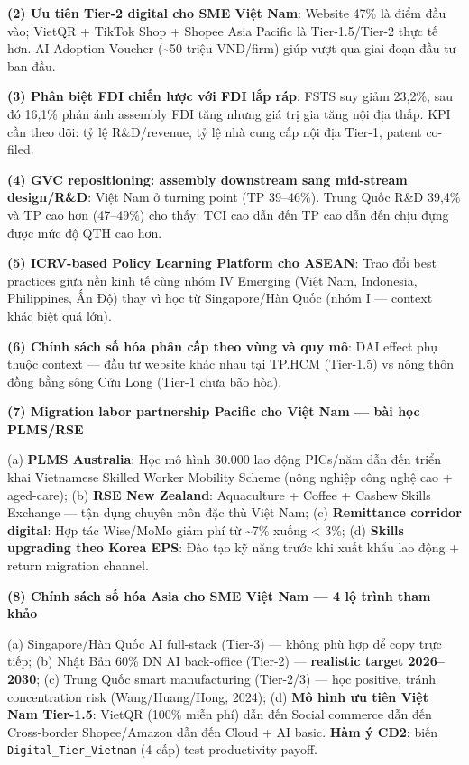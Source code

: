 \documentclass[12pt,a4paper]{article}
\begin{document}
\textbf{(2) Ưu tiên Tier-2 digital cho SME Việt Nam}: Website 47\% là
điểm đầu vào; VietQR + TikTok Shop + Shopee Asia Pacific là
Tier-1.5/Tier-2 thực tế hơn. AI Adoption Voucher (\textasciitilde50
triệu VND/firm) giúp vượt qua giai đoạn đầu tư ban đầu.

\textbf{(3) Phân biệt FDI chiến lược với FDI lắp ráp}: FSTS suy giảm
23,2\%, sau đó 16,1\% phản ánh assembly FDI tăng nhưng giá trị gia tăng
nội địa thấp. KPI cần theo dõi: tỷ lệ R\&D/revenue, tỷ lệ nhà cung cấp
nội địa Tier-1, patent co-filed.

\textbf{(4) GVC repositioning: assembly downstream sang mid-stream
design/R\&D}: Việt Nam ở turning point (TP 39--46\%). Trung Quốc R\&D
39,4\% và TP cao hơn (47--49\%) cho thấy: TCI cao dẫn đến TP cao dẫn đến
chịu đựng được mức độ QTH cao hơn.

\textbf{(5) ICRV-based Policy Learning Platform cho ASEAN}: Trao đổi
best practices giữa nền kinh tế cùng nhóm IV Emerging (Việt Nam,
Indonesia, Philippines, Ấn Độ) thay vì học từ Singapore/Hàn Quốc (nhóm I
--- context khác biệt quá lớn).

\textbf{(6) Chính sách số hóa phân cấp theo vùng và quy mô}: DAI effect
phụ thuộc context --- đầu tư website khác nhau tại TP.HCM (Tier-1.5) vs
nông thôn đồng bằng sông Cửu Long (Tier-1 chưa bão hòa).

\textbf{(7) Migration labor partnership Pacific cho Việt Nam --- bài học
PLMS/RSE}

(a) \textbf{PLMS Australia}: Học mô hình 30.000 lao động PICs/năm dẫn
đến triển khai Vietnamese Skilled Worker Mobility Scheme (nông nghiệp
công nghệ cao + aged-care); (b) \textbf{RSE New Zealand}: Aquaculture +
Coffee + Cashew Skills Exchange --- tận dụng chuyên môn đặc thù Việt
Nam; (c) \textbf{Remittance corridor digital}: Hợp tác Wise/MoMo giảm
phí từ \textasciitilde7\% xuống \textless{} 3\%; (d) \textbf{Skills
upgrading theo Korea EPS}: Đào tạo kỹ năng trước khi xuất khẩu lao động
+ return migration channel.

\textbf{(8) Chính sách số hóa Asia cho SME Việt Nam --- 4 lộ trình tham
khảo}

(a) Singapore/Hàn Quốc AI full-stack (Tier-3) --- không phù hợp để copy
trực tiếp; (b) Nhật Bản 60\% DN AI back-office (Tier-2) ---
\textbf{realistic target 2026--2030}; (c) Trung Quốc smart manufacturing
(Tier-2/3) --- học positive, tránh concentration risk (Wang/Huang/Hong,
2024); (d) \textbf{Mô hình ưu tiên Việt Nam Tier-1.5}: VietQR (100\%
miễn phí) dẫn đến Social commerce dẫn đến Cross-border Shopee/Amazon dẫn
đến Cloud + AI basic. \textbf{Hàm ý CĐ2}: biến
\texttt{Digital\_Tier\_Vietnam} (4 cấp) test productivity payoff.
\end{document}
